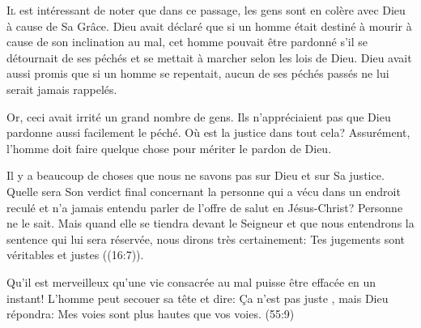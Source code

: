 \dvrule







\lettrine{I}{l} est intéressant de noter que dans ce passage,
 les gens sont en colère avec Dieu à cause de Sa Grâce.
 Dieu avait déclaré que si un homme était destiné à mourir
 à cause de son inclination au mal, cet homme pouvait être pardonné
 s'il se détournait de ses péchés et se mettait à marcher
 selon les lois de Dieu. Dieu avait aussi promis que si un homme se repentait,
 aucun de ses péchés passés ne lui serait jamais rappelés.

Or, ceci avait irrité un grand nombre de gens. Ils n'appréciaient pas que Dieu
 pardonne aussi facilement le péché. Où est la justice dans tout cela?
 Assurément, l'homme doit faire quelque chose pour mériter le pardon de Dieu. 

Il y a beaucoup de choses que nous ne savons pas sur Dieu et sur Sa justice.
 Quelle sera Son verdict final concernant la personne qui a vécu
 dans un endroit reculé et n'a jamais entendu parler de l'offre de salut
 en Jésus-Christ? Personne ne le sait. Mais quand elle se tiendra
 devant le Seigneur et que nous entendrons la sentence qui lui sera réservée,
 nous dirons très certainement: 
 \Og Tes jugements sont véritables et justes \Fg{} ((16:7)). 



Qu'il est merveilleux qu'une vie consacrée au mal puisse être effacée
 en un instant! L'homme peut secouer sa tête et dire: 
 \Og Ça n'est pas juste \Fg{}, mais Dieu répondra: 
 \Og Mes voies sont plus hautes que vos voies. \Fg{}
 (55:9)

